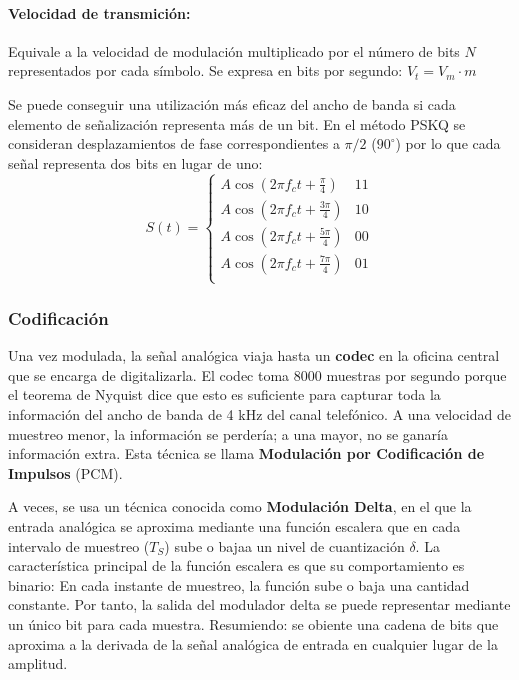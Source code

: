 \paragraph{Velocidad de transmición:} Equivale a la velocidad de modulación multiplicado por el número de bits \(N\) representados por cada símbolo. Se expresa en bits por segundo: \(V_t = V_m\cdot m\)

Se puede conseguir una utilización más eficaz del ancho de banda si cada elemento de señalización representa más de un bit.  En el método PSKQ  se consideran desplazamientos de fase correspondientes a \(\pi/2\) (\(90^\circ\)) por lo que cada señal representa dos bits en lugar de uno:
\[
  S(t) = \begin{cases}
    A\cos(2\pi f_c t + \frac{\pi}{4}) & \text{11} \\
    A\cos(2\pi f_c t + \frac{3\pi}{4}) & \text{10} \\
    A\cos(2\pi f_c t + \frac{5\pi}{4}) & \text{00} \\
    A\cos(2\pi f_c t + \frac{7\pi}{4}) & \text{01} \\
  \end{cases}
\]

\subsubsection{Codificación}
Una vez modulada, la señal analógica viaja hasta un \textbf{codec}  en la oficina central  que se encarga de digitalizarla. El codec toma 8000 muestras por segundo porque el teorema de Nyquist dice que esto es suficiente para capturar toda la información del ancho de banda de 4 kHz del canal telefónico. A una velocidad de muestreo menor, la información se perdería; a una mayor, no se ganaría información extra. Esta técnica se llama \textbf{Modulación por Codificación de Impulsos} (PCM).   

A veces, se usa un técnica conocida como \textbf{Modulación Delta}, en el que la entrada analógica se aproxima mediante una función escalera que en cada intervalo de muestreo (\(T_S\)) sube o bajaa un nivel de cuantización \(\delta\). La característica principal de la función escalera es que su comportamiento es binario: En cada instante de muestreo, la función sube o baja una cantidad constante. Por tanto, la salida del modulador delta se puede representar mediante un único bit para cada muestra. Resumiendo: se obiente una cadena de bits que aproxima a la derivada de la señal analógica de entrada en cualquier lugar de la amplitud.

